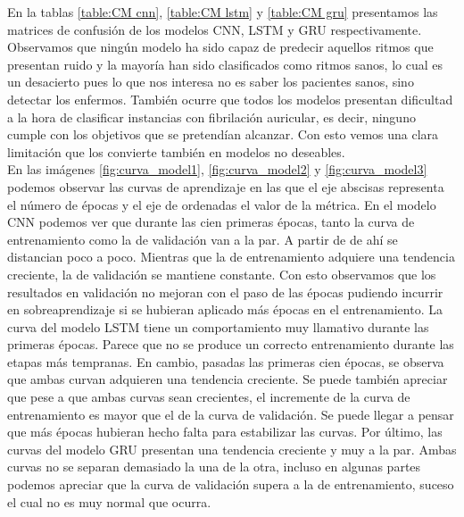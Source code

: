     En la tablas \ref{table:CM cnn}, \ref{table:CM lstm} y \ref{table:CM gru} presentamos las matrices de confusión de los modelos CNN, LSTM y GRU respectivamente. Observamos que ningún modelo ha sido capaz de predecir aquellos ritmos que presentan ruido y la mayoría han sido clasificados como ritmos sanos, lo cual es un desacierto pues lo que nos interesa no es saber los pacientes sanos, sino detectar los enfermos. También ocurre que todos los modelos presentan dificultad a la hora de clasificar instancias con fibrilación auricular, es decir, ninguno cumple con los objetivos que se pretendían alcanzar. Con esto vemos una clara limitación que los convierte también en modelos no deseables. \\
    
    
    En las imágenes \ref{fig:curva_model1}, \ref{fig:curva_model2} y \ref{fig:curva_model3} podemos observar las curvas de aprendizaje en las que el eje abscisas representa el número de épocas y el eje de ordenadas el valor de la métrica. En el modelo CNN podemos ver que durante las cien primeras épocas, tanto la curva de entrenamiento como la de validación van a la par. A partir de de ahí se distancian poco a poco. Mientras que la de entrenamiento adquiere una tendencia creciente, la de validación se mantiene constante. Con esto observamos que los resultados en validación no mejoran con el paso de las épocas pudiendo incurrir en sobreaprendizaje si se hubieran aplicado más épocas en el entrenamiento. La curva del modelo LSTM tiene un comportamiento muy llamativo durante las primeras épocas. Parece que no se produce un correcto entrenamiento durante las etapas más tempranas. En cambio, pasadas las primeras cien épocas, se observa que ambas curvan adquieren una tendencia creciente. Se puede también apreciar que pese a que ambas curvas sean crecientes, el incremente de la curva de entrenamiento es mayor que el de la curva de validación. Se puede llegar a pensar que más épocas hubieran hecho falta para estabilizar las curvas. Por último, las curvas del modelo GRU presentan una tendencia creciente y muy a la par. Ambas curvas no se separan demasiado la una de la otra, incluso en algunas partes podemos apreciar que la curva de validación supera a la de entrenamiento, suceso el cual no es muy normal que ocurra. \\
    

